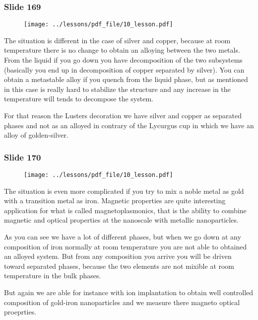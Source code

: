 \documentclass[../main/main.tex]{subfiles}
\begin{document}
\newpage

\subsubsection{Slide 169}

\begin{figure}[h!]
\centering
\texttt{[image: ../lessons/pdf\_file/10\_lesson.pdf]}
\end{figure}

The situation is different in the case of silver and copper, because at room temperature there is no change to obtain an alloying between the two metals. From the liquid if you go down you have decomposition of the two subsystems (basically you end up in decomposition of copper separated by silver). You can obtain a metastable alloy if you quench from the liquid phase, but as mentioned in this case is really hard to stabilize the structure and any increase in the temperature will tends to decompose the system.

For that reason the Lusters decoration we have silver and copper as separated phases and not as an alloyed in contrary of the Lycurgus cup in which we have an alloy of golden-silver.

\newpage

\subsubsection{Slide 170}

\begin{figure}[h!]
\centering
\texttt{[image: ../lessons/pdf\_file/10\_lesson.pdf]}
\end{figure}

The situation is even more complicated if you try to mix a noble metal as gold with a transition metal as iron. Magnetic properties are quite interesting application for what is called magnetoplasmonics, that is the ability to combine magnetic and optical properties at the nanoscale with metallic nanoparticles.

As you can see we have a lot of different phases, but when we go down at any composition of iron normally at room temperature you are not able to obtained an alloyed system. But from any composition you arrive you will be driven toward separated phases, because the two elements are not mixible at room temperature in the bulk phases.

But again we are able for instance with ion implantation to obtain well controlled composition of gold-iron nanoparticles and we measure there magneto optical proeprties.
\end{document}

